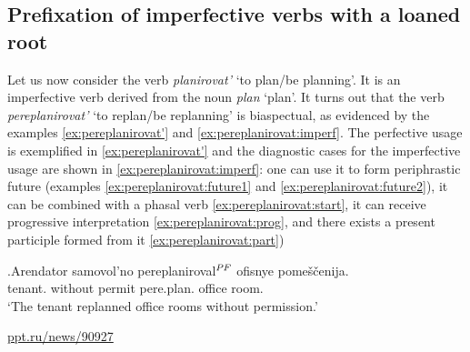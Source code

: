
\subsection{Prefixation of imperfective verbs with a loaned root}\label{subsection:perf:imperf}
Let us now consider the verb \textit{planirovat'} `to plan/be planning'. It is an imperfective verb derived from the noun \textit{plan} `plan'. It turns out that the verb \textit{pereplanirovat'} `to replan/be replanning' is biaspectual, as evidenced by the examples \ref{ex:pereplanirovat'} and \ref{ex:pereplanirovat:imperf}. The perfective usage is exemplified in \ref{ex:pereplanirovat'} and the diagnostic cases for the imperfective usage are shown in \ref{ex:pereplanirovat:imperf}: one can use it to form periphrastic future (examples \ref{ex:pereplanirovat:future1} and \ref{ex:pereplanirovat:future2}), it can be combined with a phasal verb \ref{ex:pereplanirovat:start}, it can receive progressive interpretation \ref{ex:pereplanirovat:prog}, and there exists a present participle formed from it \ref{ex:pereplanirovat:part}) 

\exg.\label{ex:pereplanirovat'}Arendator samovol'no pereplaniroval$^{\mathit{PF}}$ ofisnye pome\v{s}\v{c}enija.\\
tenant. {without permit} pere.plan. office room.\\
\vspace{0.5em}
`The tenant replanned office rooms without permission.'
\begin{flushright}
\vspace{-0.5em}
\url{ppt.ru/news/90927}
\end{flushright}

